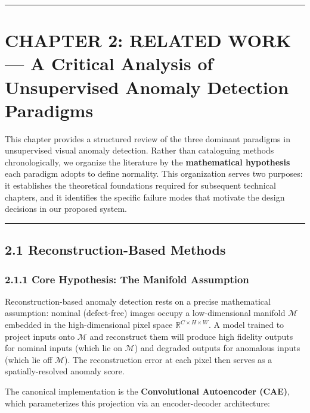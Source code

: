 \begin{center}\rule{0.5\linewidth}{0.5pt}\end{center}

\section{CHAPTER 2: RELATED WORK --- A Critical Analysis of Unsupervised Anomaly Detection Paradigms}\label{chapter-2-related-work-a-critical-analysis-of-unsupervised-anomaly-detection-paradigms}

This chapter provides a structured review of the three dominant paradigms in unsupervised visual anomaly detection. Rather than cataloguing methods chronologically, we organize the literature by the \textbf{mathematical hypothesis} each paradigm adopts to define normality. This organization serves two purposes: it establishes the theoretical foundations required for subsequent technical chapters, and it identifies the specific failure modes that motivate the design decisions in our proposed system.

\begin{center}\rule{0.5\linewidth}{0.5pt}\end{center}

\subsection{2.1 Reconstruction-Based Methods}\label{reconstruction-based-methods}

\subsubsection{2.1.1 Core Hypothesis: The Manifold Assumption}\label{core-hypothesis-the-manifold-assumption}

Reconstruction-based anomaly detection rests on a precise mathematical assumption: nominal (defect-free) images occupy a low-dimensional manifold \(\mathcal{M}\) embedded in the high-dimensional pixel space \(\mathbb{R}^{C \times H \times W}\). A model trained to project inputs onto \(\mathcal{M}\) and reconstruct them will produce high fidelity outputs for nominal inputs (which lie on \(\mathcal{M}\)) and degraded outputs for anomalous inputs (which lie off \(\mathcal{M}\)). The reconstruction error at each pixel then serves as a spatially-resolved anomaly score.

The canonical implementation is the \textbf{Convolutional Autoencoder (CAE)}, which parameterizes this projection via an encoder-decoder architecture:

